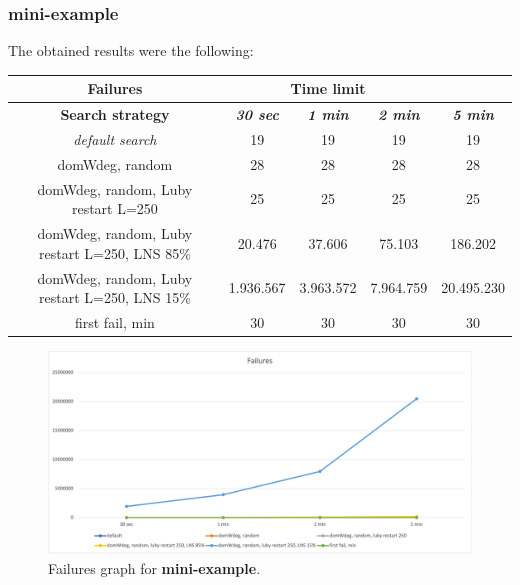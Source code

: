 \subsubsection{mini-example}
\label{subsubsec:mini-example}
The obtained results were the following:
{
\renewcommand{\arraystretch}{2}
\begin{longtable}[h]{| c | c | c | c | c |}
    \hline
    \textbf{Failures} & \multicolumn{3}{c}{\textbf{Time limit}} & \\
    \hline
    \textbf{Search strategy} & \textbf{\textit{30 sec}} & \textbf{\textit{1 min}} & \textbf{\textit{2 min}} & \textbf{\textit{5 min}} \\
    \hline
    \endhead
    \textit{default search}                       &      19 &      19 &      19 &       19 \\
    \hline
    domWdeg, random                               &      28 &      28 &      28 &       28 \\
    \hline
    domWdeg, random, Luby restart L=250           &      25 &      25 &      25 &       25 \\
    \hline
    domWdeg, random, Luby restart L=250, LNS 85\% &   20.476 &   37.606 &   75.103 &   186.202 \\
    \hline
    domWdeg, random, Luby restart L=250, LNS 15\% & 1.936.567 & 3.963.572 & 7.964.759 & 20.495.230 \\
    \hline
    first fail, min                               &      30 &      30 &      30 &       30 \\
    \hline
\end{longtable}
}
\begin{figure}[H]
    \centering
    \includegraphics[width=0.8\columnwidth]{../graphs/mini-example-failures.png}
    \caption{Failures graph for \textbf{mini-example}.}
\end{figure}
